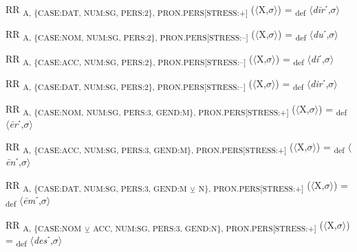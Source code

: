 {\begin{exe}
 RR \textsubscript{A, \{CASE:DAT, NUM:SG, PERS:2\}, PRON.PERS[STRESS:+]} ($\langle$X,$\sigma $$\rangle$) = \textsubscript{def} $\langle$\textit{d\=ir}ˊ,$\sigma $$\rangle$
\end{exe}

\begin{exe}
 RR \textsubscript{A, \{CASE:NOM, NUM:SG, PERS:2\}, PRON.PERS[STRESS:–]} ($\langle$X,$\sigma $$\rangle$) = \textsubscript{def} $\langle$\textit{du}ˊ,$\sigma $$\rangle$
\end{exe}

\begin{exe}
 RR \textsubscript{A, \{CASE:ACC, NUM:SG, PERS:2\}, PRON.PERS[STRESS:–]} ($\langle$X,$\sigma $$\rangle$) = \textsubscript{def} $\langle$\textit{di}ˊ,$\sigma $$\rangle$
\end{exe}

\begin{exe}
 RR \textsubscript{A, \{CASE:DAT, NUM:SG, PERS:2\}, PRON.PERS[STRESS:–]} ($\langle$X,$\sigma $$\rangle$) = \textsubscript{def} $\langle$\textit{dir}ˊ,$\sigma $$\rangle$
\end{exe}

\begin{exe}
 RR \textsubscript{A, \{CASE:NOM, NUM:SG, PERS:3, GEND:M\}, PRON.PERS[STRESS:+]} ($\langle$X,$\sigma $$\rangle$) = \textsubscript{def} $\langle$\textit{\=er}ˊ,$\sigma $$\rangle$
\end{exe}

\begin{exe}
 RR \textsubscript{A, \{CASE:ACC, NUM:SG, PERS:3, GEND:M\}, PRON.PERS[STRESS:+]} ($\langle$X,$\sigma $$\rangle$) = \textsubscript{def} $\langle$\textit{\=en}ˊ,$\sigma $$\rangle$
\end{exe}

\begin{exe}
 RR \textsubscript{A, \{CASE:DAT, NUM:SG, PERS:3, GEND:M} \textsubscript{${\veebar}$}\textsubscript{ N\}, PRON.PERS[STRESS:+]} ($\langle$X,$\sigma $$\rangle$) = \textsubscript{def} $\langle$\textit{\=em}ˊ,$\sigma $$\rangle$
\end{exe}

\begin{exe}
 RR \textsubscript{A, \{CASE:NOM} \textsubscript{${\veebar}$}\textsubscript{ ACC, NUM:SG, PERS:3, GEND:N\}, PRON.PERS[STRESS:+]} ($\langle$X,$\sigma $$\rangle$) = \textsubscript{def} $\langle$\textit{des}ˊ,$\sigma $$\rangle$
\end{exe}

}
